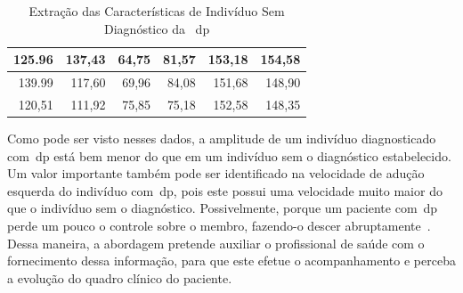 \begin{table}[h]
\begin{tabular}{|r|r|r|r|r|r|}
125.96                                                                                   & 137,43                                                                                   & 64,75                                                              & 81,57                                                             & 153,18            & 154,58             \\ \hline
139.99                                                                                   & 117,60                                                                                   & 69,96                                                              & 84,08                                                             & 151,68            & 148,90             \\ \hline
120,51                                                                                   & 111,92                                                                                   & 75,85                                                              & 75,18                                                             & 152,58            & 148,35             \\ \hline
\end{tabular}
\caption{Extração das Características de Indivíduo Sem Diagnóstico da ~\ac{dp}}
\label{table:extracao_caracterisca_saudavel}
\end{table}

Como pode ser visto nesses dados, a amplitude de um indivíduo diagnosticado com~\ac{dp} está bem menor do que em um indivíduo sem o diagnóstico estabelecido. Um valor importante também pode ser identificado na velocidade de adução esquerda do indivíduo com~\ac{dp}, pois este possui uma velocidade muito maior do que o indivíduo sem o diagnóstico. Possivelmente, porque um paciente com~\ac{dp} perde um pouco o controle sobre o membro, fazendo-o descer abruptamente~\cite{protpar010}. Dessa maneira, a abordagem pretende auxiliar o profissional de saúde com o fornecimento dessa informação, para que este efetue o acompanhamento e perceba a evolução do quadro clínico do paciente. 

